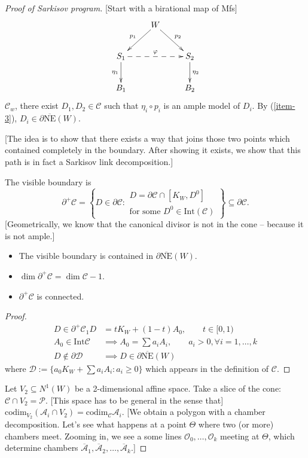 \begin{proof}[Proof of Sarkisov program]
[Start with a birational map of Mfs]
$$
\xymatrix{
& W\ar[dl]_{p_1}\ar[dr]^{p_2}\\
S_1\ar@{-->}[rr]^{\varphi}\ar[d]_{\eta_1}
&&S_2\ar[d]^{\eta_2}\\
B_1
&&B_2
}
$$
$\mathcal{C}_w$, there exist $D_1,D_2 \in
\mathcal{C}$
such that $\eta_i \circ p_i$ is an ample
model of $D_i$.
By (\ref{item-3}), $D_i \in \partial
\overline{\text{NE}}(W)$.

[The idea is to show that there exists a way
that joins
those two points which contained completely
in the
boundary.
After showing it exists,
we show that this path is in fact a Sarkisov
link decomposition.]

The visible boundary is
$$
\partial^+ \mathcal{C}
=\left\{D \in \partial \mathcal{C}:
\substack{ D= \partial \mathcal{C} \cap
[K_W,D^0 ]\\
\text{for some }D^0 \in
\text{Int}(\mathcal{C}) }\right\}
\subseteq \partial\mathcal{C}.
$$
[Geometrically, we know that the canonical
divisor
is not in the cone -- because it is not
ample.]

\begin{lemma}
\label{lemma-boundary}
\begin{itemize}
\item The visible boundary is contained in
$\partial \overline{
\text{NE}}(W)$.

\item $\dim \partial^+\mathcal{C}=\dim
\mathcal{C}-1$.
\item $\partial^+\mathcal{C}$ is connected.
\end{itemize}
\end{lemma}

\begin{proof}
$$
\begin{aligned}
D \in \partial^+ \mathcal{C}_1 D&=
t K_W+(1-t) A_0,\qquad  t \in [0,1)\\
A_0 \in \text{Int}\mathcal{C}
&  \implies A_0 = \sum a_i A_i,\qquad a_i>0,
\forall i=1,…,k\\
D\not\in \partial \mathcal{D} &\implies
D \in \partial \overline{\text{NE}}(W)
\end{aligned}
$$
where $\mathcal{D}:=\{a_0K_W+\sum a_iA_i:a_i
\geq 0\}$
which appears in the definition of
$\mathcal{C}$.
\end{proof}

\noindent
Let $V_2 \subseteq N^1(W)$
be a 2-dimensional affine space.
Take a slice of the cone:
$\mathcal{C} \cap V_2=\mathcal{P}$.
[This space has to be general in the sense
that]
$\text{codim}_{V_2}(\mathcal{A}_i \cap V_2)=
\text{codim}_{\mathcal{C}}\mathcal{A}_i$.
[We obtain a polygon with a chamber
decomposition.
Let's see what happens at a point $\Theta$
where two
(or more) chambers meet.
Zooming in, we see a some lines
$\mathcal{O}_0,…,\mathcal{O}_k$
meeting at $\Theta$, which determine chambers
$\overline{\mathcal{A}}_1,
\overline{\mathcal{A}}_2,…,
\overline{\mathcal{A}}_k$.]


\end{proof}
